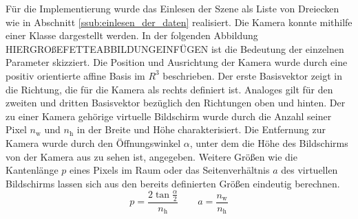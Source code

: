 \documentclass[crop=false]{standalone}
\begin{document}
      Für die Implementierung wurde das Einlesen der Szene als Liste von Dreiecken wie in Abschnitt \ref{ssub:einlesen_der_daten} realisiert.
      Die Kamera konnte mithilfe einer Klasse dargestellt werden.
      In der folgenden Abbildung HIERGROßEFETTEABBILDUNGEINFÜGEN ist die Bedeutung der einzelnen Parameter skizziert.
      Die Position und Ausrichtung der Kamera wurde durch eine positiv orientierte affine Basis im $R^3$ beschrieben.
      Der erste Basisvektor zeigt in die Richtung, die für die Kamera als rechts definiert ist.
      Analoges gilt für den zweiten und dritten Basisvektor bezüglich den Richtungen oben und hinten.
      Der zu einer Kamera gehörige virtuelle Bildschirm wurde durch die Anzahl seiner Pixel $n_\mathrm{w}$ und $n_\mathrm{h}$ in der Breite und Höhe charakterisiert.
      Die Entfernung zur Kamera wurde durch den Öffnungswinkel $\alpha$, unter dem die Höhe des Bildschirms von der Kamera aus zu sehen ist, angegeben.
      Weitere Größen wie die Kantenlänge $p$ eines Pixels im Raum oder das Seitenverhältnis $a$ des virtuellen Bildschirms lassen sich aus den bereits definierten Größen eindeutig berechnen.
      \[
        p = \frac{2\tan \frac{\alpha}{2}}{n_\mathrm{h}}
        \qquad
        a = \frac{n_\mathrm{w}}{n_\mathrm{h}}
      \]
\end{document}
